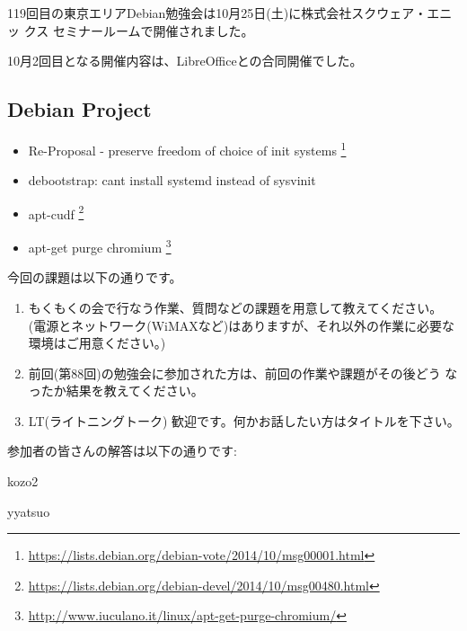 \documentclass[mingoth,a4paper]{jsarticle}
\begin{document}
119回目の東京エリアDebian勉強会は10月25日(土)に株式会社スクウェア・エニッ
クス セミナールームで開催されました。

10月2回目となる開催内容は、LibreOfficeとの合同開催でした。

\subsection{Debian Project}

\begin{itemize}
\item Re-Proposal - preserve freedom of choice of init systems \footnote{\url{https://lists.debian.org/debian-vote/2014/10/msg00001.html}}
\item {} debootstrap: cant install systemd instead of sysvinit
\item apt-cudf \footnote{\url{https://lists.debian.org/debian-devel/2014/10/msg00480.html}}
\item apt-get purge chromium \footnote{\url{http://www.iuculano.it/linux/apt-get-purge-chromium/}}
\end{itemize}


今回の課題は以下の通りです。
\begin{screen}
  \begin{enumerate}

  \item %
    もくもくの会で行なう作業、質問などの課題を用意して教えてください。
    (電源とネットワーク(WiMAXなど)はありますが、それ以外の作業に必要な
    環境はご用意ください。)

  \item %
    前回(第88回)の勉強会に参加された方は、前回の作業や課題がその後どう
    なったか結果を教えてください。

  \item %
    LT(ライトニングトーク) 歓迎です。何かお話したい方はタイトルを下さい。

  \end{enumerate}
\end{screen}

参加者の皆さんの解答は以下の通りです:

\begin{prework}{ kozo2 }
\end{prework}

\begin{prework}{ yyatsuo }
\end{prework}
\end{document}
